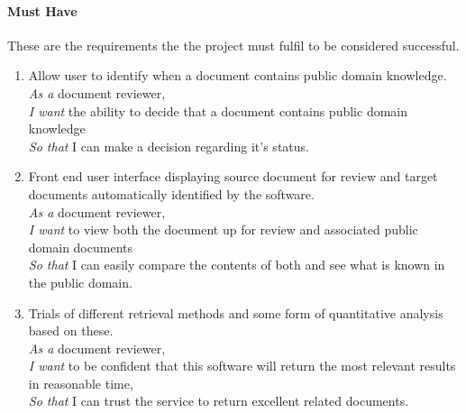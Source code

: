 \documentclass{l4proj}
\begin{document}
\paragraph{Must Have}
These are the requirements the the project must fulfil to be considered successful.
\begin{enumerate}[label=\textbf{M.\arabic*}]
\item Allow user to identify when a document contains public domain knowledge. \\
\textit{As a} document reviewer, \\
\textit{I want} the ability to decide that a document contains public domain knowledge \\
\textit{So that} I can make a decision regarding it's status. \\
\item Front end user interface displaying source document for review and target documents automatically identified by the software. \\
\textit{As a} document reviewer, \\
\textit{I want} to view both the document up for review and associated public domain documents \\
\textit{So that} I can easily compare the contents of both and see what is known in the public domain.
\item Trials of different retrieval methods and some form of quantitative analysis based on these. \\
\textit{As a} document reviewer, \\
\textit{I want} to be confident that this software will return the most relevant results in reasonable time, \\
\textit{So that} I can trust the service to return excellent related documents.
\end{enumerate}
\end{document}

